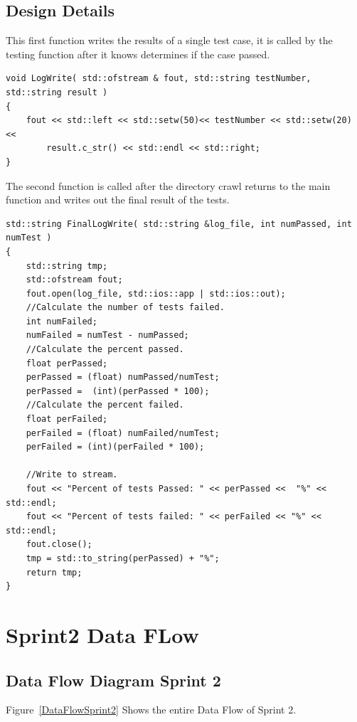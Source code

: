 \subsection{Design Details}
This first function writes the results of a single test case, it is called by the testing function after it knows determines if the case
passed.
\begin{lstlisting}
void LogWrite( std::ofstream & fout, std::string testNumber, std::string result )
{
    fout << std::left << std::setw(50)<< testNumber << std::setw(20) <<
        result.c_str() << std::endl << std::right;
}
\end{lstlisting}
The second function is called after the directory crawl returns to the main function and writes out the final result of the tests.
\begin{lstlisting}
std::string FinalLogWrite( std::string &log_file, int numPassed, int numTest )
{
    std::string tmp;
    std::ofstream fout;
    fout.open(log_file, std::ios::app | std::ios::out);
    //Calculate the number of tests failed.
    int numFailed;
    numFailed = numTest - numPassed;
    //Calculate the percent passed.
    float perPassed;
    perPassed = (float) numPassed/numTest;
    perPassed =  (int)(perPassed * 100);
    //Calculate the percent failed.
    float perFailed;
    perFailed = (float) numFailed/numTest;
    perFailed = (int)(perFailed * 100);

    //Write to stream.
    fout << "Percent of tests Passed: " << perPassed <<  "%" << std::endl;
    fout << "Percent of tests failed: " << perFailed << "%" << std::endl;
    fout.close();
    tmp = std::to_string(perPassed) + "%";
    return tmp;
}
\end{lstlisting}

\pagebreak

\section{Sprint2 Data FLow}

\subsection{Data Flow Diagram Sprint 2}

Figure~\ref{DataFlowSprint2} Shows the entire Data Flow of Sprint 2.

